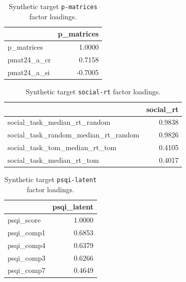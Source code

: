 \documentclass{article}
\begin{document}
\begin{table}[H]
\centering
\begin{tabular}{lr}
\toprule
 & p\_matrices \\
\midrule
p\_matrices & 1.0000 \\
pmat24\_a\_cr & 0.7158 \\
pmat24\_a\_si & -0.7005 \\
\bottomrule
\end{tabular}

\footnotesize
\caption{Synthetic target \texttt{p-matrices} factor loadings.}
\normalsize
\label{tab:p-matrices}
\end{table}


\begin{table}[H]
\centering
\begin{tabular}{lr}
\toprule
 & social\_rt \\
\midrule
social\_task\_median\_rt\_random & 0.9838 \\
social\_task\_random\_median\_rt\_random & 0.9826 \\
social\_task\_tom\_median\_rt\_tom & 0.4105 \\
social\_task\_median\_rt\_tom & 0.4017 \\
\bottomrule
\end{tabular}

\footnotesize
\caption{Synthetic target \texttt{social-rt} factor loadings.}
\normalsize
\label{tab:social-rt}
\end{table}


\begin{table}[H]
\centering
\begin{tabular}{lr}
\toprule
 & psqi\_latent \\
\midrule
psqi\_score & 1.0000 \\
psqi\_comp1 & 0.6853 \\
psqi\_comp4 & 0.6379 \\
psqi\_comp3 & 0.6266 \\
psqi\_comp7 & 0.4649 \\
\bottomrule
\end{tabular}

\footnotesize
\caption{Synthetic target \texttt{psqi-latent} factor loadings.}
\normalsize
\label{tab:psqi-latent}
\end{table}
\end{document}
